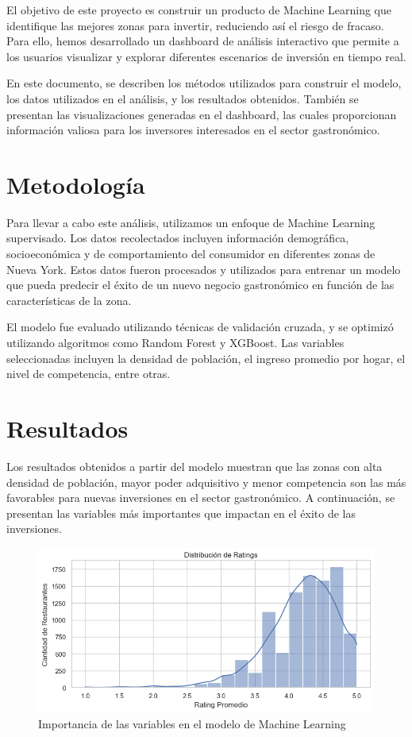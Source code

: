 \documentclass[twoside,11pt]{article}
\begin{document}
El objetivo de este proyecto es construir un producto de Machine Learning que identifique las mejores zonas para invertir, reduciendo así el riesgo de fracaso. Para ello, hemos desarrollado un dashboard de análisis interactivo que permite a los usuarios visualizar y explorar diferentes escenarios de inversión en tiempo real.

En este documento, se describen los métodos utilizados para construir el modelo, los datos utilizados en el análisis, y los resultados obtenidos. También se presentan las visualizaciones generadas en el dashboard, las cuales proporcionan información valiosa para los inversores interesados en el sector gastronómico.

\section{Metodología}

Para llevar a cabo este análisis, utilizamos un enfoque de Machine Learning supervisado. Los datos recolectados incluyen información demográfica, socioeconómica y de comportamiento del consumidor en diferentes zonas de Nueva York. Estos datos fueron procesados y utilizados para entrenar un modelo que pueda predecir el éxito de un nuevo negocio gastronómico en función de las características de la zona.

El modelo fue evaluado utilizando técnicas de validación cruzada, y se optimizó utilizando algoritmos como Random Forest y XGBoost. Las variables seleccionadas incluyen la densidad de población, el ingreso promedio por hogar, el nivel de competencia, entre otras.

\section{Resultados}

Los resultados obtenidos a partir del modelo muestran que las zonas con alta densidad de población, mayor poder adquisitivo y menor competencia son las más favorables para nuevas inversiones en el sector gastronómico. A continuación, se presentan las variables más importantes que impactan en el éxito de las inversiones.

\begin{figure}[h] 
    \centering
    \includegraphics[width=1\textwidth]{importancia_variables.png} 
    \caption{Importancia de las variables en el modelo de Machine Learning}
    \label{fig:importancia_variables} 
\end{figure}
\end{document}
